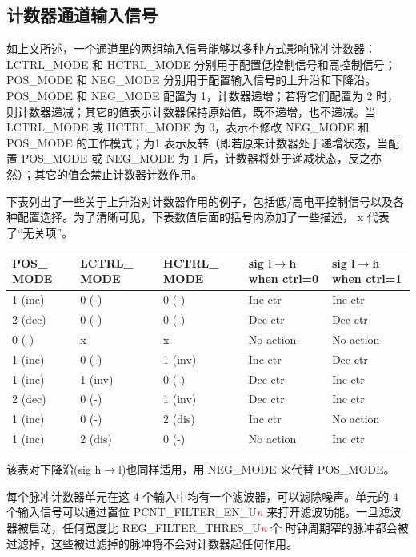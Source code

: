 \documentclass[main\_\_CN.tex]{subfiles}
\begin{document}
\subsection{计数器通道输入信号}

如上文所述，一个通道里的两组输入信号能够以多种方式影响脉冲计数器：LCTRL\_MODE 和 HCTRL\_MODE 分别用于配置低控制信号和高控制信号；POS\_MODE 和 NEG\_MODE 分别用于配置输入信号的上升沿和下降沿。 POS\_MODE 和 NEG\_MODE 配置为 1，计数器递增；若将它们配置为 2 时，则计数器递减；其它的值表示计数器保持原始值，既不递增，也不递减。当LCTRL\_MODE 或 HCTRL\_MODE 为 0，表示不修改 NEG\_MODE 和 POS\_MODE 的工作模式；为1 表示反转（即若原来计数器处于递增状态，当配置 POS\_MODE 或 NEG\_MODE 为 1 后，计数器将处于递减状态，反之亦然）；其它的值会禁止计数器计数作用。

下表列出了一些关于上升沿对计数器作用的例子，包括低/高电平控制信号以及各种配置选择。为了清晰可见，下表数值后面的括号内添加了一些描述， x 代表了“无关项”。

\begin{longtable}[c]{ | p{3cm} | p{3cm} | p{3cm} | p{3cm} | p{3cm} |  } \hline
\rowcolor{lightgray}
POS\_ MODE & LCTRL\_ MODE & HCTRL\_ MODE  & sig l$\rightarrow$h when ctrl=0 & sig l$\rightarrow$h when ctrl=1 \\ \hline
1 (inc) & 0 (-) & 0 (-) & Inc ctr & Inc ctr \\ \hline
2 (dec) & 0 (-) & 0 (-) & Dec ctr & Dec ctr \\ \hline
0 (-) & x & x & No action & No action \\ \hline
1 (inc) & 0 (-) & 1 (inv) & Inc ctr & Dec ctr \\ \hline
1 (inc) & 1 (inv) & 0 (-) & Dec ctr & Inc ctr \\ \hline
2 (dec) & 0 (-) & 1 (inv) & Dec ctr & Inc ctr \\ \hline
1 (inc) & 0 (-) & 2 (dis) & Inc ctr & No action \\ \hline
1 (inc) & 2 (dis) & 0 (-) & No action & Inc ctr \\ \hline
\end{longtable}

该表对下降沿(sig h$\rightarrow$l)也同样适用，用 NEG\_MODE 来代替 POS\_MODE。

每个脉冲计数器单元在这 4 个输入中均有一个滤波器，可以滤除噪声。单元的 4 个输入信号可以通过置位 PCNT\_FILTER\_EN\_U\textcolor{red}{\it{n}} 来打开滤波功能。一旦滤波器被启动，任何宽度比 REG\_FILTER\_THRES\_U\textcolor{red}{\it{n}} 个 时钟周期窄的脉冲都会被过滤掉，这些被过滤掉的脉冲将不会对计数器起任何作用。
\end{document}
